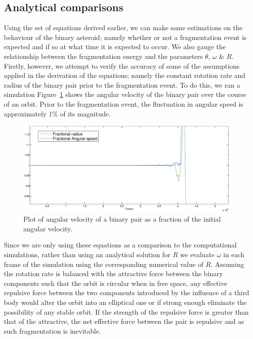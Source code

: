 \documentclass[letterpaper, preprint, paper,11pt]{AAS}	%
\begin{document}
\subsection{Analytical comparisons}
Using the set of equations derived earlier, we can make some estimations on the behaviour of the binary asteroid; namely whether or not a fragmentation event is expected and if so at what time it is expected to occur. We also gauge the relationship between the fragmentation energy and the parameters $\theta$, $\omega$ \& $R$. Firstly, however, we attempt to verify the accuracy of some of the assumptions applied in the derivation of the equations; namely the constant rotation rate and radius of the binary pair prior to the fragmentation event. To do this, we ran a simulation Figure~\ref{fig:omega} shows the angular velocity of the binary pair over the course of an orbit. Prior to the fragmentation event, the fluctuation in angular speed is approximately 1\% of its magnitude.

\begin{center}
\begin{figure}[H]
\centering
\centerline{\includegraphics[width=1.2\textwidth]{omega.eps}} 
\caption{Plot of angular velocity of a binary pair as a fraction of the initial angular velocity.} 
\label{fig:omega}
\end{figure}
\end{center}

Since we are only using these equations as a comparison to the computational simulations, rather than using an analytical solution for $R$ we evaluate $\omega$ in each frame of the simulation using the corresponding numerical value of $R$. Assuming the rotation rate is balanced with the attractive force between the binary components such that the orbit is circular when in free space, any effective repulsive force between the two components introduced by the influence of a third body would alter the orbit into an elliptical one or if strong enough eliminate the possibility of any stable orbit. If the strength of the repulsive force is greater than that of the attractive, the net effective force between the pair is repulsive and as such fragmentation is inevitable. 
\end{document}
